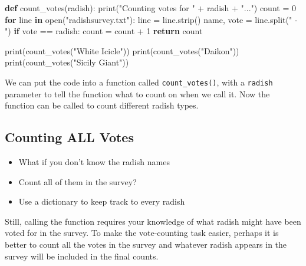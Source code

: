 \documentclass[
  letterpaper,
]{scrbook}
\newenvironment{Shaded}{\begin{snugshade}}{\end{snugshade}}
\newcommand{\BuiltInTok}[1]{\textcolor[rgb]{0.00,0.23,0.31}{#1}}
\newcommand{\ControlFlowTok}[1]{\textcolor[rgb]{0.00,0.23,0.31}{\textbf{#1}}}
\newcommand{\DecValTok}[1]{\textcolor[rgb]{0.68,0.00,0.00}{#1}}
\newcommand{\KeywordTok}[1]{\textcolor[rgb]{0.00,0.23,0.31}{\textbf{#1}}}
\newcommand{\NormalTok}[1]{\textcolor[rgb]{0.00,0.23,0.31}{#1}}
\newcommand{\OperatorTok}[1]{\textcolor[rgb]{0.37,0.37,0.37}{#1}}
\newcommand{\StringTok}[1]{\textcolor[rgb]{0.13,0.47,0.30}{#1}}
\providecommand{\tightlist}{%
  \setlength{\itemsep}{0pt}\setlength{\parskip}{0pt}}
\begin{document}
\begin{Shaded}
\begin{Highlighting}[]
\KeywordTok{def}\NormalTok{ count\_votes(radish):}
    \BuiltInTok{print}\NormalTok{(}\StringTok{"Counting votes for "} \OperatorTok{+}\NormalTok{ radish }\OperatorTok{+} \StringTok{"..."}\NormalTok{)}
\NormalTok{    count }\OperatorTok{=} \DecValTok{0}
    \ControlFlowTok{for}\NormalTok{ line }\KeywordTok{in} \BuiltInTok{open}\NormalTok{(}\StringTok{"radishsurvey.txt"}\NormalTok{):}
\NormalTok{        line }\OperatorTok{=}\NormalTok{ line.strip()}
\NormalTok{        name, vote }\OperatorTok{=}\NormalTok{ line.split(}\StringTok{" {-} "}\NormalTok{)}
        \ControlFlowTok{if}\NormalTok{ vote }\OperatorTok{==}\NormalTok{ radish:}
\NormalTok{            count }\OperatorTok{=}\NormalTok{ count }\OperatorTok{+} \DecValTok{1}
    \ControlFlowTok{return}\NormalTok{ count}

\BuiltInTok{print}\NormalTok{(count\_votes(}\StringTok{"White Icicle"}\NormalTok{))}
\BuiltInTok{print}\NormalTok{(count\_votes(}\StringTok{"Daikon"}\NormalTok{))}
\BuiltInTok{print}\NormalTok{(count\_votes(}\StringTok{"Sicily Giant"}\NormalTok{))}
\end{Highlighting}
\end{Shaded}

We can put the code into a function called \texttt{count\_votes()}, with
a \texttt{radish} parameter to tell the function what to count on when
we call it. Now the function can be called to count different radish
types.

\subsection*{Counting ALL Votes}\label{counting-all-votes}

\begin{itemize}
\tightlist
\item
  What if you don't know the radish names
\item
  Count all of them in the survey?
\item
  Use a dictionary to keep track to every radish
\end{itemize}

Still, calling the function requires your knowledge of what radish might
have been voted for in the survey. To make the vote-counting task
easier, perhaps it is better to count all the votes in the survey and
whatever radish appears in the survey will be included in the final
counts.
\end{document}
